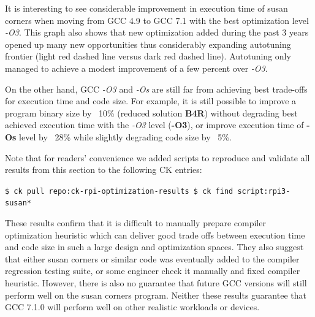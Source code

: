It is interesting to see considerable improvement in execution time of susan corners 
when moving from GCC 4.9 to GCC 7.1 with the best optimization level \textit{-O3}.
%
This graph also shows that new optimization added during the past 3 years opened up
many new opportunities thus considerably expanding autotuning frontier (light red
dashed line versus dark red dashed line).
%
Autotuning only managed to achieve a modest improvement of a few percent over \textit{-O3}.

On the other hand, GCC \textit{-O3} and \textit{-Os} are still far from achieving
best trade-offs for execution time and code size.
%
For example, it is still possible to improve a program binary size 
by ~10\% (reduced solution \textbf{B4R}) without degrading best achieved 
execution time with the \textit{-O3} level (\textbf{-O3}), or improve 
execution time of \textbf{-Os} level by ~28\% while slightly degrading code size by ~5\%.

Note that for readers' convenience we added scripts to reproduce and validate 
all results from this section to the following CK entries:

\begin{flushleft}
\texttt{\$ ck pull repo:ck-rpi-optimization-results \newline
\$ ck find script:rpi3-susan*}
\end{flushleft}

These results confirm that it is difficult to manually prepare compiler optimization
heuristic which can deliver good trade offs between execution time and code size 
in such a large design and optimization spaces.
%
They also suggest that either susan corners or similar code 
was eventually added to the compiler regression testing suite,
or some engineer check it manually and fixed compiler heuristic.
%
However, there is also no guarantee that future GCC versions will still
perform well on the susan corners program.
%
Neither these results guarantee that GCC 7.1.0
will perform well on other realistic workloads or devices.
